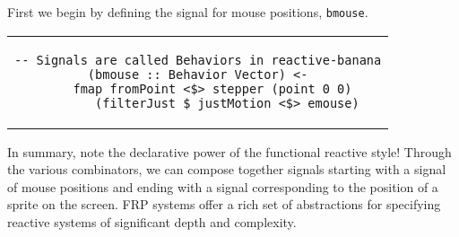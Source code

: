 First we begin by defining the signal for mouse positions, \lstinline!bmouse!.
\begin{center}\begin{tabular}{c}\begin{lstlisting}
-- Signals are called Behaviors in reactive-banana
(bmouse :: Behavior Vector) <-
    fmap fromPoint <$> stepper (point 0 0)
        (filterJust $ justMotion <$> emouse)
\end{lstlisting}\end{tabular}\end{center}
\lstinline!bmouse! has type \lstinline!Behavior Vector!, a continuous signal of a vector (a coordinate pair) which is generated by the time-varying position of the mouse cursor.

Next, we can reflect this signal onto another object by referencing \lstinline!bmouse! in code.
For example, we can now define the velocity of a sprite on screen in relation to the mouse cursor:
\begin{center}\begin{tabular}{c}\begin{lstlisting}
  bvelocity :: Behavior Vector
  bvelocity =
    (\pos mouse -> speedup $ mouse `vecSub` pos `vecSub` vec 0 45)
    <$> bposition <*> bmouse
    where
    speedup v = v `vecScale` (vecLengthDouble v / 20)
\end{lstlisting}\end{tabular}\end{center}
This code calculates the velocity of the sprite as the difference of the sprite's position and the mouse's position with a constant \lstinline!speedup! factor.

Finally, with \lstinline!bvelocity! in hand, we can define the sprite's position \lstinline!bposition! in terms of the velocity signal we just defined:
\begin{center}\begin{tabular}{c}\begin{lstlisting}
(bposition :: Behavior Vector)
  <- accumB (vec 0 0) $
      (\v pos -> clipToFrame $ (v `vecScale` dt) `vecAdd` pos)
      <$> bvelocity <@ etick
\end{lstlisting}\end{tabular}\end{center}

In summary, note the declarative power of the functional reactive style!
Through the various combinators, we can compose together signals starting with a signal of mouse positions and ending with a signal corresponding to the position of a sprite on the screen.
FRP systems offer a rich set of abstractions for specifying reactive systems of significant depth and complexity.

